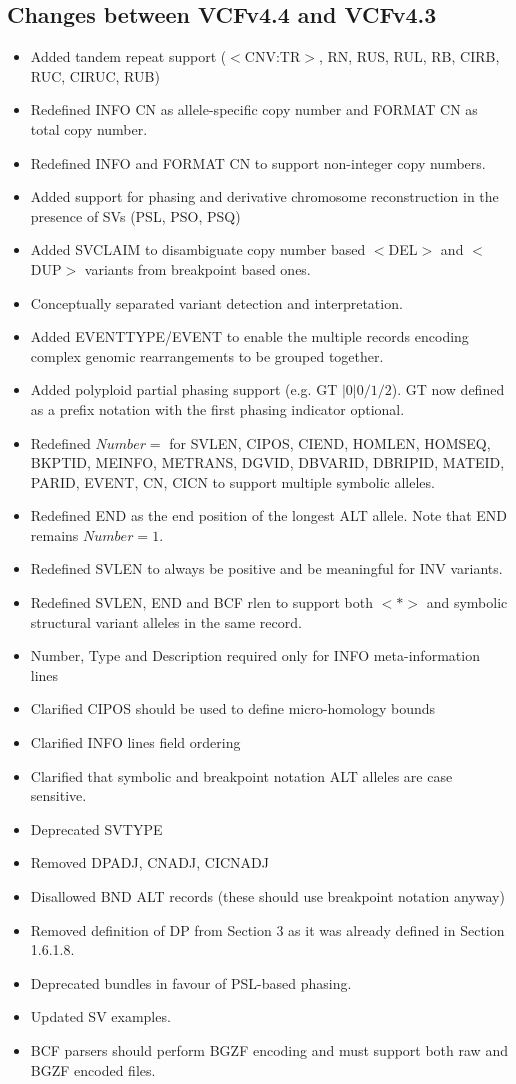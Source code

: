 \documentclass[8pt]{article}
\begin{document}
\subsection{Changes between VCFv4.4 and VCFv4.3}

\begin{itemize}
\item Added tandem repeat support ($<$CNV:TR$>$, RN, RUS, RUL, RB, CIRB, RUC, CIRUC, RUB)
\item Redefined INFO CN as allele-specific copy number and FORMAT CN as total copy number.
\item Redefined INFO and FORMAT CN to support non-integer copy numbers.
\item Added support for phasing and derivative chromosome reconstruction in the presence of SVs (PSL, PSO, PSQ)
\item Added SVCLAIM to disambiguate copy number based $<$DEL$>$ and $<$DUP$>$ variants from breakpoint based ones.
\item Conceptually separated variant detection and interpretation.
\item Added EVENTTYPE/EVENT to enable the multiple records encoding complex genomic rearrangements to be grouped together.
\item Added polyploid partial phasing support (e.g. GT $|0|0/1/2$). GT now defined as a prefix notation with the first phasing indicator optional.
\item Redefined $Number=$ for SVLEN, CIPOS, CIEND, HOMLEN, HOMSEQ, BKPTID, MEINFO, METRANS, DGVID, DBVARID, DBRIPID, MATEID, PARID, EVENT, CN, CICN to support multiple symbolic alleles.
\item Redefined END as the end position of the longest ALT allele. Note that END remains $Number=1$.
\item Redefined SVLEN to always be positive and be meaningful for INV variants.
\item Redefined SVLEN, END and BCF rlen to support both $<*>$ and symbolic structural variant alleles in the same record.
\item Number, Type and Description required only for INFO meta-information lines
\item Clarified CIPOS should be used to define micro-homology bounds
\item Clarified INFO lines field ordering
\item Clarified that symbolic and breakpoint notation ALT alleles are case sensitive.
\item Deprecated SVTYPE
\item Removed DPADJ, CNADJ, CICNADJ
\item Disallowed BND ALT records (these should use breakpoint notation anyway)
\item Removed definition of DP from Section 3 as it was already defined in Section 1.6.1.8.
\item Deprecated bundles in favour of PSL-based phasing.
\item Updated SV examples.
\item BCF parsers should perform BGZF encoding and must support both raw and BGZF encoded files.
\end{itemize}
\end{document}
